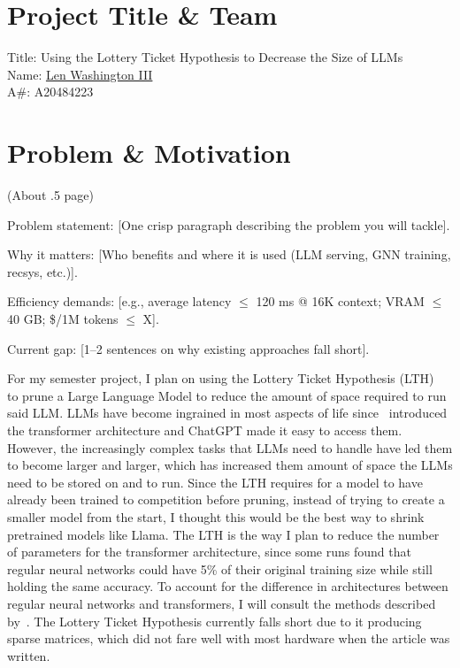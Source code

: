 \documentclass[
	title={Project Proposal}
]{cs595project}
\begin{document}
\section{Project Title \& Team}\label{sec:project-title-&-team}
Title: Using the Lottery Ticket Hypothesis to Decrease the Size of LLMs\\
Name: \href{mailto:lwashington3@hawk.illinoistech.edu}{Len Washington III}\\
A\#: A20484223

\section{Problem \& Motivation}\label{sec:problem-&-motivation}
\ifdetails
(About .5 page)

Problem statement: [One crisp paragraph describing the problem you will tackle].

Why it matters: [Who benefits and where it is used (LLM serving, GNN training, recsys, etc.)].

Efficiency demands: [e.g., average latency $\leq$ 120 ms @ 16K context; VRAM $\leq$ 40 GB; \$/1M tokens $\leq$ X].

Current gap: [1–2 sentences on why existing approaches fall short].

\fi
For my semester project, I plan on using the Lottery Ticket Hypothesis (LTH)~\supercite{Lottery-Ticket-Hypothesis} to prune a Large Language Model to reduce the amount of space required to run said LLM\@.
LLMs have become ingrained in most aspects of life since~\citeauthor{vaswani2017attention} introduced the transformer architecture and ChatGPT made it easy to access them.
However, the increasingly complex tasks that LLMs need to handle have led them to become larger and larger, which has increased them amount of space the LLMs need to be stored on and to run.
Since the LTH requires for a model to have already been trained to competition before pruning, instead of trying to create a smaller model from the start, I thought this would be the best way to shrink pretrained models like Llama.
The LTH is the way I plan to reduce the number of parameters for the transformer architecture, since some runs found that regular neural networks could have 5\% of their original training size while still holding the same accuracy\supercite{Lottery-Ticket-Hypothesis}.
To account for the difference in architectures between regular neural networks and transformers, I will consult the methods described by~\citeauthor{LTH-Transformer}.
The Lottery Ticket Hypothesis currently falls short due to it producing sparse matrices, which did not fare well with most hardware when the article was written.
\end{document}
